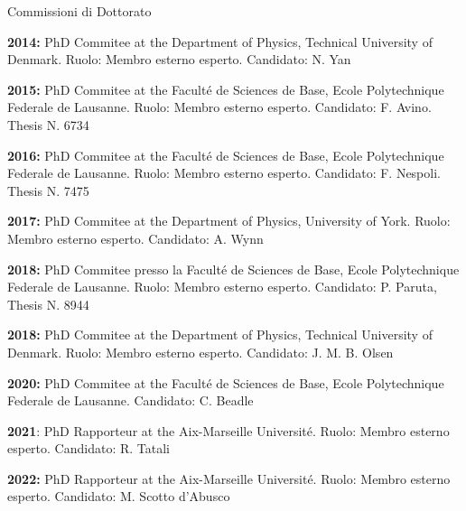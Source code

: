 \begin{statementblock}{Commissioni di Dottorato}
\end{statementblock}
\nopagebreak
\begin{enumerate}[label={[L\arabic*]}]
\item \textbf{2014:} PhD Commitee at the Department of Physics, Technical
  University of Denmark. Ruolo: Membro esterno esperto. Candidato: N. Yan

\item \textbf{2015:} PhD Commitee at the Facult{\'e} de Sciences de Base,
  Ecole Polytechnique Federale de Lausanne. Ruolo: Membro esterno
  esperto. Candidato:
  F. Avino. Thesis N. 6734

\item \textbf{2016:} PhD Commitee at the Facult{\'e} de Sciences de Base,
  Ecole Polytechnique Federale de Lausanne. Ruolo: Membro esterno
  esperto. Candidato:
  F. Nespoli. Thesis N. 7475

\item \textbf{2017:} PhD Commitee at the Department of Physics,
  University of York. Ruolo: Membro esterno esperto. Candidato: A. Wynn

\item \textbf{2018:} PhD Commitee presso la Facult{\'e} de Sciences de Base,
  Ecole Polytechnique Federale de Lausanne. Ruolo: Membro esterno
  esperto. Candidato: P. Paruta,
  Thesis N. 8944

\item \textbf{2018:} PhD Commitee at the Department of Physics, Technical
  University of Denmark. Ruolo: Membro esterno esperto. Candidato: J. M. B. Olsen
  
\item \textbf{2020:} PhD Commitee at the Facult{\'e} de Sciences de Base,
  Ecole Polytechnique Federale de Lausanne. Candidato: C. Beadle

\item \textbf{2021}: PhD Rapporteur at the Aix-Marseille
  Universit{\'e}. Ruolo: Membro esterno esperto. 
  Candidato: R. Tatali

\item \textbf{2022:} PhD Rapporteur at the Aix-Marseille
  Universit{\'e}. Ruolo: Membro esterno esperto. 
  Candidato: M. Scotto d'Abusco

\end{enumerate}
